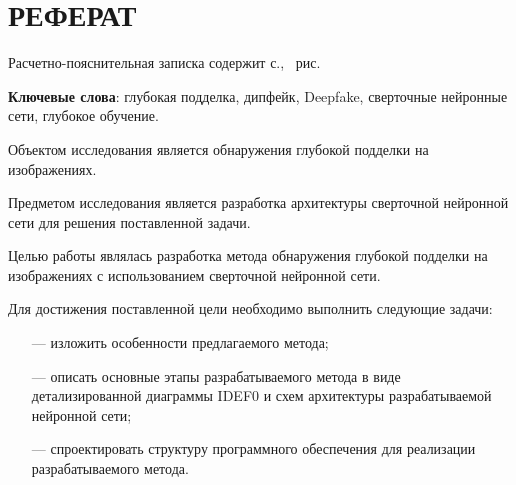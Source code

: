 \part*{РЕФЕРАТ}
Расчетно-пояснительная записка содержит \pageref{LastPage} с., \totalfigures\ рис.

\textbf{Ключевые слова}: глубокая подделка, дипфейк, Deepfake, сверточные нейронные сети, глубокое обучение.

Объектом исследования является обнаружения глубокой подделки на изображениях.

Предметом исследования является разработка архитектуры сверточной нейронной сети для решения поставленной задачи.

Целью работы являлась разработка метода обнаружения глубокой подделки на изображениях с использованием сверточной нейронной сети.

Для достижения поставленной цели необходимо выполнить следующие задачи:

\begin{itemize}
    \item[---] изложить особенности предлагаемого метода;
    \item[---] описать основные этапы разрабатываемого метода в виде детализированной диаграммы IDEF0 и схем архитектуры разрабатываемой нейронной сети;
    \item[---] спроектировать структуру программного обеспечения для реализации разрабатываемого метода.
\end{itemize}

\pagebreak